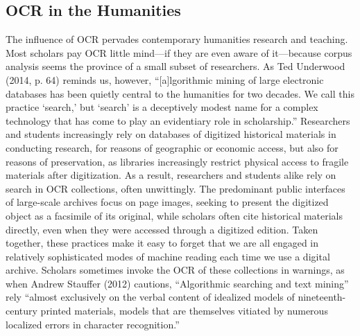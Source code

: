 \documentclass[twoside,11pt]{report}
\begin{document}
\subsection{OCR in the Humanities}

The influence of OCR pervades contemporary humanities research and teaching. Most scholars pay OCR little mind---if they are even aware of it---because corpus analysis seems the province of a small subset of researchers. As Ted Underwood (2014, p. 64) reminds us, however, ``[a]lgorithmic mining of large electronic databases has been quietly central to the humanities for two decades. We call this practice `search,' but `search' is a deceptively modest name for a complex technology that has come to play an evidentiary role in scholarship.'' Researchers and students increasingly rely on databases of digitized historical materials in conducting research, for reasons of geographic or economic access, but also for reasons of preservation, as libraries increasingly restrict physical access to fragile materials after digitization. As a result, researchers and students alike rely on search in OCR collections, often unwittingly. The predominant public interfaces of large-scale archives focus on page images, seeking to present the digitized object as a facsimile of its original, while scholars often cite historical materials directly, even when they were accessed through a digitized edition. Taken together, these practices make it easy to forget that we are all engaged in relatively sophisticated modes of machine reading each time we use a digital archive. Scholars sometimes invoke the OCR of these collections in warnings, as when Andrew Stauffer (2012) cautions, ``Algorithmic searching and text mining'' rely ``almost exclusively on the verbal content of idealized models of nineteenth-century printed materials, models that are themselves vitiated by numerous localized errors in character recognition.''
\end{document}
